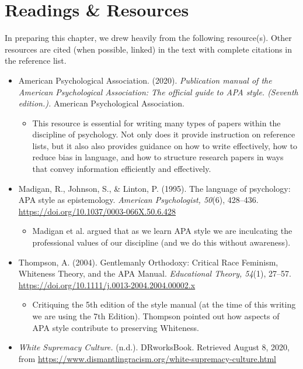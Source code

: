 \documentclass[
  11pt,
]{book}
\providecommand{\tightlist}{%
  \setlength{\itemsep}{0pt}\setlength{\parskip}{0pt}}
\begin{document}
\hypertarget{readings-resources}{%
\section{Readings \& Resources}\label{readings-resources}}

In preparing this chapter, we drew heavily from the following resource(s). Other resources are cited (when possible, linked) in the text with complete citations in the reference list.

\begin{itemize}
\tightlist
\item
  American Psychological Association. (2020). \emph{Publication manual of the American Psychological Association: The official guide to APA style. (Seventh edition.).} American Psychological Association.

  \begin{itemize}
  \tightlist
  \item
    This resource is essential for writing many types of papers within the discipline of psychology. Not only does it provide instruction on reference lists, but it also also provides guidance on how to write effectively, how to reduce bias in language, and how to structure research papers in ways that convey information efficiently and effectively.
  \end{itemize}
\item
  Madigan, R., Johnson, S., \& Linton, P. (1995). The language of psychology: APA style as epistemology. \emph{American Psychologist, 50}(6), 428--436. \url{https://doi.org/10.1037/0003-066X.50.6.428}

  \begin{itemize}
  \tightlist
  \item
    Madigan et al. \citeyearpar{madigan_language_1995} argued that as we learn APA style we are inculcating the professional values of our discipline (and we do this without awareness).
  \end{itemize}
\item
  Thompson, A. (2004). Gentlemanly Orthodoxy: Critical Race Feminism, Whiteness Theory, and the APA Manual. \emph{Educational Theory, 54}(1), 27--57. \url{https://doi.org/10.1111/j.0013-2004.2004.00002.x}

  \begin{itemize}
  \tightlist
  \item
    Critiquing the 5th edition of the style manual (at the time of this writing we are using the 7th Edition). Thompson \citeyearpar{thompson_gentlemanly_2004} pointed out how aspects of APA style contribute to preserving Whiteness.
  \end{itemize}
\item
  \emph{White Supremacy Culture.} (n.d.). DRworksBook. Retrieved August 8, 2020, from \url{https://www.dismantlingracism.org/white-supremacy-culture.html}


\end{itemize}
\end{document}
